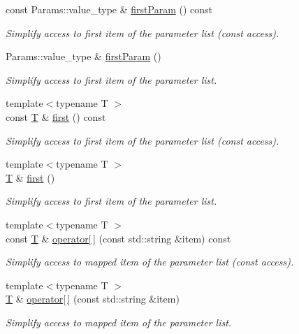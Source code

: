 \begin{DoxyCompactItemize}
const Params::value\_\-type \& \hyperlink{class_d_d4hep_1_1_conditions_1_1_abstract_map_a14b35adc0a8058a0f53c7f6bc3e4dc30}{firstParam} () const 
\begin{DoxyCompactList}\small\item\em Simplify access to first item of the parameter list (const access). \item\end{DoxyCompactList}\item 
Params::value\_\-type \& \hyperlink{class_d_d4hep_1_1_conditions_1_1_abstract_map_acedd8446b04dc419fd9f73611f01b2ef}{firstParam} ()
\begin{DoxyCompactList}\small\item\em Simplify access to first item of the parameter list. \item\end{DoxyCompactList}\item 
{\footnotesize template$<$typename T $>$ }\\const \hyperlink{class_t}{T} \& \hyperlink{class_d_d4hep_1_1_conditions_1_1_abstract_map_aa91b0ffcc6a4dcb6726d04412a083392}{first} () const 
\begin{DoxyCompactList}\small\item\em Simplify access to first item of the parameter list (const access). \item\end{DoxyCompactList}\item 
{\footnotesize template$<$typename T $>$ }\\\hyperlink{class_t}{T} \& \hyperlink{class_d_d4hep_1_1_conditions_1_1_abstract_map_a555bae85a354a06df73d72eaf248fd80}{first} ()
\begin{DoxyCompactList}\small\item\em Simplify access to first item of the parameter list. \item\end{DoxyCompactList}\item 
{\footnotesize template$<$typename T $>$ }\\const \hyperlink{class_t}{T} \& \hyperlink{class_d_d4hep_1_1_conditions_1_1_abstract_map_aad3888e0cd1a6c1ea6ed9fb8b3611d90}{operator\mbox{[}$\,$\mbox{]}} (const std::string \&item) const 
\begin{DoxyCompactList}\small\item\em Simplify access to mapped item of the parameter list (const access). \item\end{DoxyCompactList}\item 
{\footnotesize template$<$typename T $>$ }\\\hyperlink{class_t}{T} \& \hyperlink{class_d_d4hep_1_1_conditions_1_1_abstract_map_a3cd2ad3c542cc2fb92aeb4e769d94509}{operator\mbox{[}$\,$\mbox{]}} (const std::string \&item)
\begin{DoxyCompactList}\small\item\em Simplify access to mapped item of the parameter list. \item\end{DoxyCompactList}\end{DoxyCompactItemize}
